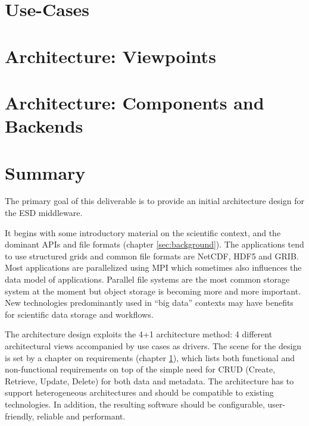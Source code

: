 \documentclass[a4paper,11pt]{esiwace-modified}
\begin{document}
\chapter{Use-Cases}
\label{chap:use cases}




\chapter{Architecture: Viewpoints}
\label{chap:viewpoints}





\chapter{Architecture: Components and Backends}
\label{chap:components and backends}





\chapter{Summary}
\label{chap:summary}

The primary goal of this deliverable is to provide an initial architecture design for the ESD middleware.

It begins with some introductory material on the scientific context, and the dominant APIs and file formats (chapter \ref{sec:background}).
The applications tend to use structured grids and common file formats are NetCDF, HDF5 and GRIB.
Most applications are parallelized using MPI which sometimes also influences the data model of applications.
Parallel file systems are the most common storage system at the moment but object storage is becoming more and more important.
New technologies predominantly used in ``big data'' contexts may have benefits for scientific data storage and workflows.

The architecture design exploits the 4+1 architecture method: 4 different architectural views accompanied by use cases as drivers.
The scene for the design is set by a chapter on requirements (chapter \ref{chap:use cases}), which lists both functional and non-functional requirements on top of the simple need for CRUD (Create, Retrieve, Update, Delete) for both data and metadata.
The architecture has to support heterogeneous architectures and should be compatible to existing technologies.
In addition, the resulting software should be configurable, user-friendly, reliable and performant.
\end{document}

